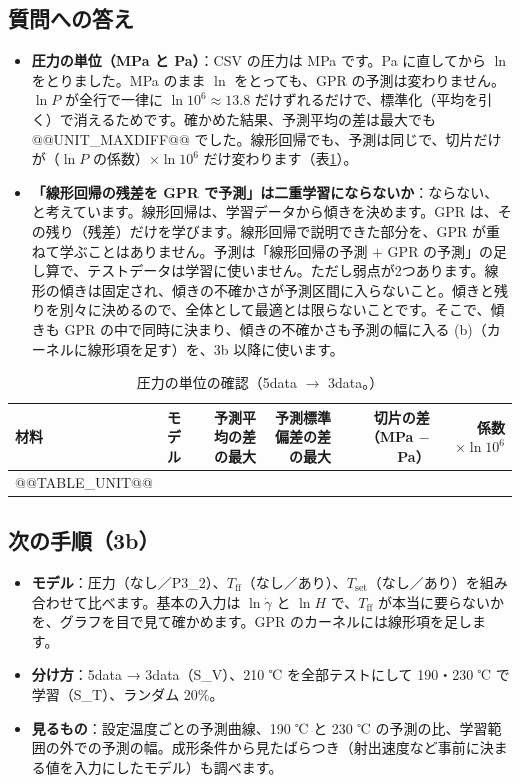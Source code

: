 \documentclass[paper=a4paper,fontsize=10.5pt,line_length=44zw,number_of_lines=38]{jlreq}
\newcommand{\file}[1]{\texttt{\detokenize{#1}}}
\newcommand{\gd}{\dot{\gamma}}
\newcommand{\PII}{P3\_2}
\newcommand{\Tff}{T_{\mathrm{ff}}}
\newcommand{\Tset}{T_{\mathrm{set}}}
\newenvironment{points}{\begin{itemize}[label=$\triangleright$,leftmargin=1.5\zw,itemsep=0.3ex,topsep=0.5ex,parsep=0pt]}{\end{itemize}}
\newcommand{\pt}[1]{\item \textbf{#1}：}
\begin{document}
\subsection{質問への答え}
\begin{points}
\pt{圧力の単位（MPa と Pa）}CSV の圧力は MPa です。Pa に直してから $\ln$ をとりました。MPa のまま $\ln$ をとっても、GPR の予測は変わりません。$\ln P$ が全行で一律に $\ln 10^6 \approx 13.8$ だけずれるだけで、標準化（平均を引く）で消えるためです。確かめた結果、予測平均の差は最大でも @@UNIT_MAXDIFF@@ でした。線形回帰でも、予測は同じで、切片だけが（$\ln P$ の係数）$\times \ln 10^6$ だけ変わります（表\ref{tab:unit}）。
\pt{「線形回帰の残差を GPR で予測」は二重学習にならないか}ならない、と考えています。線形回帰は、学習データから傾きを決めます。GPR は、その残り（残差）だけを学びます。線形回帰で説明できた部分を、GPR が重ねて学ぶことはありません。予測は「線形回帰の予測 $+$ GPR の予測」の足し算で、テストデータは学習に使いません。ただし弱点が2つあります。線形の傾きは固定され、傾きの不確かさが予測区間に入らないこと。傾きと残りを別々に決めるので、全体として最適とは限らないことです。そこで、傾きも GPR の中で同時に決まり、傾きの不確かさも予測の幅に入る (b)（カーネルに線形項を足す）を、3b 以降に使います。
\end{points}

\begin{table}[H]
\caption{圧力の単位の確認（5data $\to$ 3data。\file{unit_check.csv}）}\label{tab:unit}
\begin{tabularx}{\linewidth}{@{}l>{\raggedright\arraybackslash}p{3\zw}rrrr@{}}
\toprule
材料 & モデル & 予測平均の差の最大 & 予測標準偏差の差の最大 & 切片の差（MPa $-$ Pa） & 係数 $\times\ln 10^6$ \\
\midrule
@@TABLE_UNIT@@
\bottomrule
\end{tabularx}
\end{table}

\subsection{次の手順（3b）}
\begin{points}
\pt{モデル}圧力（なし／\PII）、$\Tff$（なし／あり）、$\Tset$（なし／あり）を組み合わせて比べます。基本の入力は $\ln\gd$ と $\ln H$ で、$\Tff$ が本当に要らないかを、グラフを目で見て確かめます。GPR のカーネルには線形項を足します。
\pt{分け方}5data → 3data（S\_V）、210 ℃ を全部テストにして 190・230 ℃ で学習（S\_T）、ランダム 20\%。
\pt{見るもの}設定温度ごとの予測曲線、190 ℃ と 230 ℃ の予測の比、学習範囲の外での予測の幅。成形条件から見たばらつき（射出速度など事前に決まる値を入力にしたモデル）も調べます。
\end{points}
\end{document}
